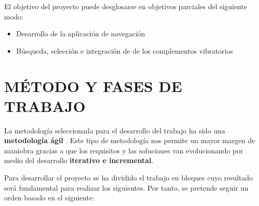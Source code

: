 \documentclass{pre-tfg}
\begin{document}
El objetivo del proyecto puede desglosarse en objetivos parciales del siguiente modo:

\begin{itemize}
  \item Desarrollo de la aplicación de navegación
  \item Búsqueda, selección e integración de de los complementos vibratorios
\end{itemize}

\section{MÉTODO Y FASES DE TRABAJO}

La metodología seleccionada para el desarrollo del trabajo ha sido una \textbf{metodología ágil} \cite{Poole09} . Este tipo de metodología nos permite un mayor margen de maniobra gracias a que los requisitos y las soluciones van evolucionando por medio del desarrollo \textbf{iterativo e incremental}.

Para desarrollar el proyecto se ha dividido el trabajo en bloques cuyo resultado será fundamental para realizar los siguientes. Por tanto, se pretende seguir un orden basado en el siguiente:
\end{document}
